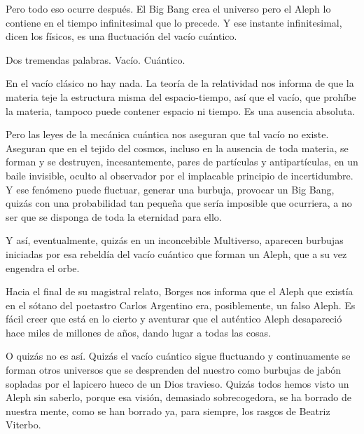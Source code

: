 \documentclass[11pt,a4paper]{article}
\begin{document}
Pero todo eso ocurre después. El Big Bang crea el universo pero el Aleph lo contiene en el tiempo infinitesimal que lo precede. Y ese instante infinitesimal, dicen los físicos, es una fluctuación del vacío cuántico.

Dos tremendas palabras. Vacío. Cuántico.

En el vacío clásico no hay nada. La teoría de la relatividad nos informa de que la materia teje la estructura misma del espacio-tiempo, así que el vacío, que prohíbe la materia, tampoco puede contener espacio ni tiempo. Es una ausencia absoluta.

Pero las leyes de la mecánica cuántica nos aseguran que tal vacío no existe. Aseguran que en el tejido del cosmos, incluso en la ausencia de toda materia, se forman y se destruyen, incesantemente, pares de partículas y antipartículas, en un baile invisible, oculto al observador por el implacable principio de incertidumbre. Y ese fenómeno puede fluctuar, generar una burbuja, provocar un Big Bang, quizás con una probabilidad tan pequeña que sería imposible que ocurriera, a no ser que se disponga de toda la eternidad para ello.

Y así, eventualmente, quizás en un inconcebible Multiverso, aparecen burbujas iniciadas por esa rebeldía del vacío cuántico que forman un Aleph, que a su vez engendra el orbe.

Hacia el final de su magistral relato, Borges nos informa que el Aleph que existía en el sótano del poetastro Carlos Argentino era, posiblemente, un falso Aleph. Es fácil creer que está en lo cierto y aventurar que el auténtico Aleph desapareció hace miles de millones de años, dando lugar a todas las cosas.

O quizás no es así. Quizás el vacío cuántico sigue fluctuando y continuamente se forman otros universos que se desprenden del nuestro como burbujas de jabón sopladas por el lapicero hueco de un Dios travieso. Quizás todos hemos visto un Aleph sin saberlo, porque esa visión, demasiado sobrecogedora, se ha borrado de nuestra mente, como se han borrado ya, para siempre, los rasgos de Beatriz Viterbo.
\end{document}
